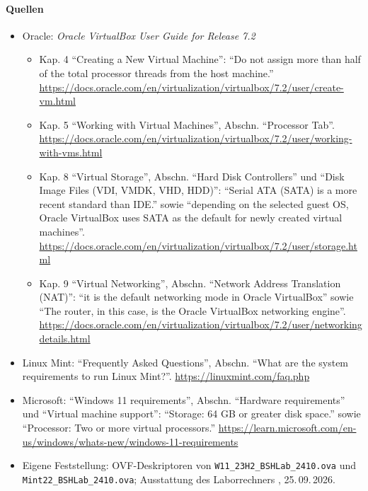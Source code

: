 \paragraph{Quellen}
\begin{itemize}[quellen]
  \item Oracle: \emph{Oracle VirtualBox User Guide for Release 7.2}
  \begin{itemize}[nosep]
    \item Kap. 4 \enquote{Creating a New Virtual Machine}: \enquote{Do not assign more than half of the total processor threads from the host machine.} \url{https://docs.oracle.com/en/virtualization/virtualbox/7.2/user/create-vm.html}
    \item Kap. 5 \enquote{Working with Virtual Machines}, Abschn. \enquote{Processor Tab}. \url{https://docs.oracle.com/en/virtualization/virtualbox/7.2/user/working-with-vms.html}
    \item Kap. 8 \enquote{Virtual Storage}, Abschn. \enquote{Hard Disk Controllers} und \enquote{Disk Image Files (VDI, VMDK, VHD, HDD)}: \enquote{Serial ATA (SATA) is a more recent standard than IDE.} sowie \enquote{depending on the selected guest OS, Oracle VirtualBox uses SATA as the default for newly created virtual machines}. \url{https://docs.oracle.com/en/virtualization/virtualbox/7.2/user/storage.html}
    \item Kap. 9 \enquote{Virtual Networking}, Abschn. \enquote{Network Address Translation (NAT)}: \enquote{it is the default networking mode in Oracle VirtualBox} sowie \enquote{The router, in this case, is the Oracle VirtualBox networking engine}. \url{https://docs.oracle.com/en/virtualization/virtualbox/7.2/user/networkingdetails.html}
  \end{itemize}
  \item Linux Mint: \enquote{Frequently Asked Questions}, Abschn. \enquote{What are the system requirements to run Linux Mint?}. \url{https://linuxmint.com/faq.php}
  \item Microsoft: \enquote{Windows 11 requirements}, Abschn. \enquote{Hardware requirements} und \enquote{Virtual machine support}: \enquote{Storage: 64 GB or greater disk space.} sowie \enquote{Processor: Two or more virtual processors.} \url{https://learn.microsoft.com/en-us/windows/whats-new/windows-11-requirements}
  \item Eigene Feststellung: OVF-Deskriptoren von \nolinkurl{W11_23H2_BSHLab_2410.ova} und \nolinkurl{Mint22_BSHLab_2410.ova}; Ausstattung des Laborrechners , 25.\,09.\,2026.
\end{itemize}

